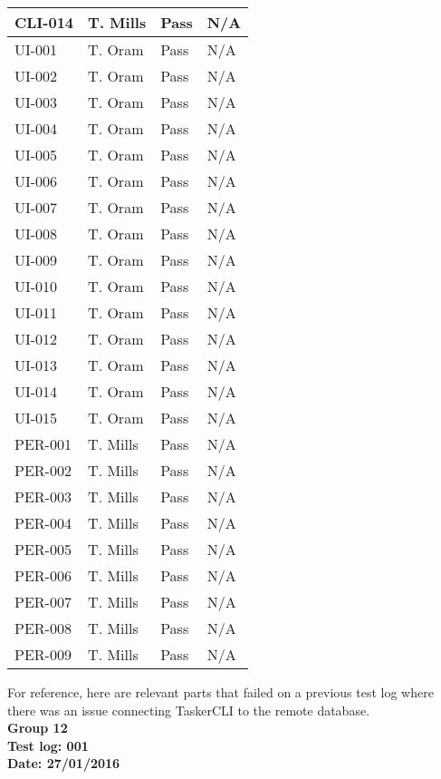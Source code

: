 \documentclass{project}
\begin{document}
\begin{longtable}{| p{1.8cm} | p{2.5cm} | p{2.5cm} | p{8.5cm} |}
\hline
CLI-014 & T. Mills & Pass & N/A \\
\hline
UI-001 & T. Oram & Pass & N/A \\
\hline
UI-002 & T. Oram & Pass & N/A \\
\hline
UI-003 & T. Oram & Pass & N/A \\
\hline
UI-004 & T. Oram & Pass & N/A \\
\hline
UI-005 & T. Oram & Pass & N/A \\
\hline
UI-006 & T. Oram & Pass & N/A \\
\hline
UI-007 & T. Oram & Pass & N/A \\
\hline
UI-008 & T. Oram & Pass & N/A \\
\hline
UI-009 & T. Oram & Pass & N/A \\
\hline
UI-010 & T. Oram & Pass & N/A \\
\hline
UI-011 & T. Oram & Pass & N/A \\
\hline
UI-012 & T. Oram & Pass & N/A \\
\hline
UI-013 & T. Oram & Pass & N/A \\
\hline
UI-014 & T. Oram & Pass & N/A \\
\hline
UI-015 & T. Oram & Pass & N/A \\
\hline
PER-001 & T. Mills & Pass & N/A \\
\hline
PER-002 & T. Mills & Pass & N/A \\
\hline
PER-003 & T. Mills & Pass & N/A \\
\hline
PER-004 & T. Mills & Pass & N/A \\
\hline
PER-005 & T. Mills & Pass & N/A \\
\hline
PER-006 & T. Mills & Pass & N/A \\
\hline
PER-007 & T. Mills & Pass & N/A \\
\hline
PER-008 & T. Mills & Pass & N/A \\
\hline
PER-009 & T. Mills & Pass & N/A \\
\hline
\end{longtable}

For reference, here are relevant parts that failed on a previous test log where there was an issue connecting TaskerCLI to the remote database. \\

\textbf{Group 12} \\
\textbf{Test log: 001} \\
\textbf{Date: 27/01/2016} \\
\end{document}
